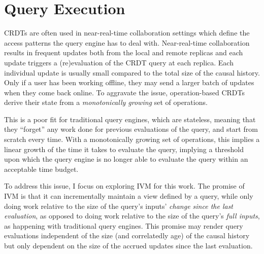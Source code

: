 \section{Query Execution}

\acp{CRDT} are often used in near-real-time collaboration settings which
define the access patterns the query engine has to deal with.
Near-real-time collaboration results in frequent updates both from the local
and remote replicas and each update triggers a (re)evaluation of the
\ac{CRDT} query at each replica.
Each individual update is usually small compared to the total size of the
causal history.
Only if a user has been working offline, they may send a larger batch of
updates when they come back online.
To aggravate the issue, operation-based \acp{CRDT} derive their state from a
\emph{monotonically growing} set of operations.

This is a poor fit for traditional query engines, which are stateless,
meaning that they ``forget'' any work done for previous evaluations of the query,
and start from scratch every time.
With a monotonically growing set of operations, this implies a linear
growth of the time it takes to evaluate the query, implying a threshold
upon which the query engine is no longer able to evaluate the query within
an acceptable time budget.

To address this issue, I focus on exploring \ac{IVM} for this work.
The promise of \ac{IVM} is that it can incrementally maintain a view defined
by a query, while only doing work relative to the size of the query's
inputs' \emph{change since the last evaluation}, as opposed to doing work
relative to the size of the query's \emph{full inputs},
as happening with traditional query engines.
This promise may render query evaluations independent of the size
(and correlatedly age) of the causal history but only dependent on the
size of the accrued updates since the last evaluation.
